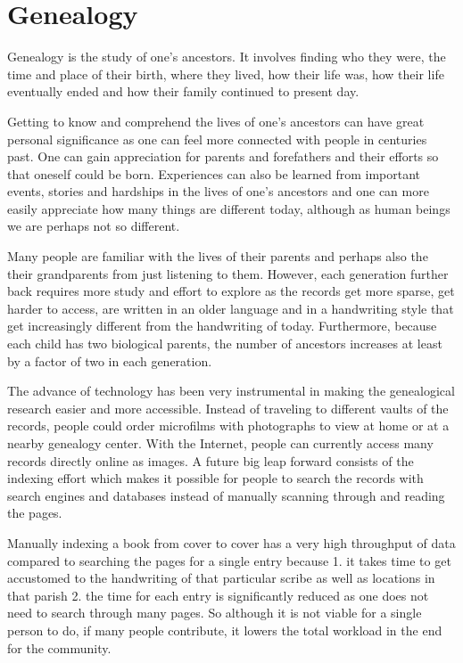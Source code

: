 
\section{Genealogy}

Genealogy is the study of one's ancestors. It involves finding who they were, the time and place of their birth, where they lived, how their life was, how their life eventually ended and how their family continued to present day.

Getting to know and comprehend the lives of one's ancestors can have great personal significance as one can feel more connected with people in centuries past. One can gain appreciation for parents and forefathers and their efforts so that oneself could be born.
Experiences can also be learned from important events, stories and hardships in the lives of one's ancestors and one can more easily appreciate how many things are different today, although as human beings we are perhaps not so different.

Many people are familiar with the lives of their parents and perhaps also the their grandparents from just listening to them.
However, each generation further back requires more study and effort to explore as the records get more sparse, get harder to access, are written in an older language and in a handwriting style that get increasingly different from the handwriting of today. Furthermore, because each child has two biological parents, the number of ancestors increases at least by a factor of two in each generation.

The advance of technology has been very instrumental in making the genealogical research easier and more accessible. Instead of traveling to different vaults of the records, people could order microfilms with photographs to view at home or at a nearby genealogy center. With the Internet, people can currently access many records directly online as images. A future big leap forward consists of the indexing effort which makes it possible for people to search the records with search engines and databases instead of manually scanning through and reading the pages.

Manually indexing a book from cover to cover has a very high throughput of data compared to searching the pages for a single entry because 1. it takes time to get accustomed to the handwriting of that particular scribe as well as locations in that parish 2. the time for each entry is significantly reduced as one does not need to search through many pages. So although it is not viable for a single person to do, if many people contribute, it lowers the total workload in the end for the community.

